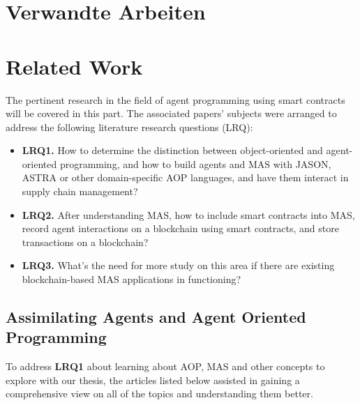 {\chapter{Verwandte Arbeiten}}
{\chapter{Related Work}}
\label{sec:related}


The pertinent research in the field of agent programming using smart contracts will be covered in this part. The associated papers' subjects were arranged to address the following literature research questions (LRQ): 
\begin{itemize}[label={}]
    \item \textbf{LRQ1.} How to determine the distinction between object-oriented and agent-oriented programming, and how to build agents and \ac{MAS} with JASON, \ac{ASTRA} or other domain-specific \ac{AOP} languages, and have them interact in supply chain management?\\
    
    \item \textbf{LRQ2.} After understanding \ac{MAS}, how to include smart contracts into \ac{MAS}, record agent interactions on a blockchain using smart contracts, and store transactions on a blockchain?\\

    \item \textbf{LRQ3.} What's the need for more study on this area if there are existing blockchain-based \ac{MAS} applications in functioning?
\end{itemize}

\section{Assimilating Agents and Agent Oriented Programming}

To address \textbf{LRQ1} about learning about \ac{AOP}, \ac{MAS} and other concepts to explore with our thesis, the articles listed below assisted in gaining a comprehensive view on all of the topics and understanding them better.

